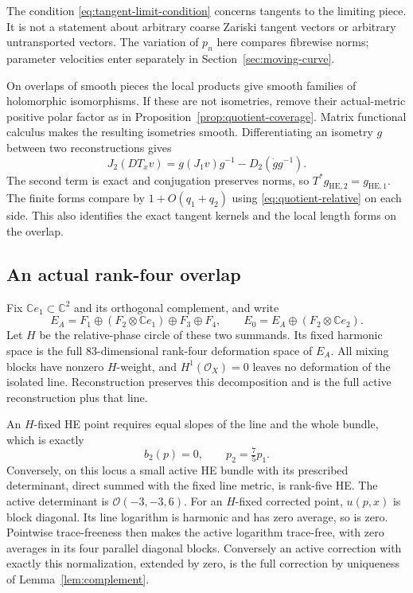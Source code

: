 \documentclass[11pt]{amsart}
\theoremstyle{definition}
\theoremstyle{remark}
\newcommand{\CC}{\mathbb C}
\newcommand{\cO}{\mathcal O}
\begin{document}
The condition \eqref{eq:tangent-limit-condition} concerns tangents to
the limiting piece. It is not a statement about arbitrary coarse
Zariski tangent vectors or arbitrary untransported vectors. The
variation of $p_n$ here compares fibrewise norms; parameter velocities
enter separately in Section~\ref{sec:moving-curve}.

On overlaps of smooth pieces the local products give smooth families
of holomorphic isomorphisms. If these are not isometries, remove their
actual-metric positive polar factor as in
Proposition~\ref{prop:quotient-coverage}. Matrix functional calculus
makes the resulting isometries smooth. Differentiating an isometry $g$
between two reconstructions gives
\begin{equation}\label{eq:isometric-transition}
 J_2(DT_xv)=g(J_1v)g^{-1}-D_2(\dot g g^{-1}).
\end{equation}
The second term is exact and conjugation preserves norms, so
$T^*g_{\mathrm{HE},2}=g_{\mathrm{HE},1}$. The finite forms compare
by $1+O(q_1+q_2)$ using \eqref{eq:quotient-relative} on each side.
This also identifies the exact tangent kernels and the local length
forms on the overlap.

\subsection{An actual rank-four overlap}\label{subsec:rank-four-overlap}
Fix $\CC e_1\subset\CC^2$ and its orthogonal complement, and write
\[
 E_A=F_1\oplus(F_2\otimes\CC e_1)\oplus F_3\oplus F_4,
 \qquad E_0=E_A\oplus(F_2\otimes\CC e_2).
\]
Let $H$ be the relative-phase circle of these two summands. Its fixed
harmonic space is the full $83$-dimensional rank-four deformation space
of $E_A$. All mixing blocks have nonzero $H$-weight, and $H^1(\cO_X)=0$
leaves no deformation of the isolated line. Reconstruction preserves
this decomposition and is the full active reconstruction plus that line.

An $H$-fixed HE point requires equal slopes of the line and the whole
bundle, which is exactly
\begin{equation}\label{eq:overlap-polarization}
 b_2(p)=0,\qquad p_2=\tfrac75p_1.
\end{equation}
Conversely, on this locus a small active HE bundle with its prescribed
determinant, direct summed with the fixed line metric, is rank-five HE.
The active determinant is $\cO(-3,-3,6)$.
For an $H$-fixed corrected point, $u(p,x)$ is block diagonal. Its line
logarithm is harmonic and has zero average, so is zero. Pointwise
trace-freeness then makes the active logarithm trace-free, with zero
averages in its four parallel diagonal blocks. Conversely an active
correction with exactly this normalization, extended by zero, is the
full correction by uniqueness of Lemma~\ref{lem:complement}.
\end{document}

